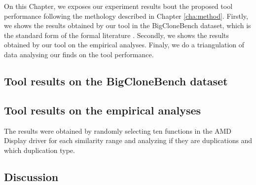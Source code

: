 On this Chapter, we exposes our experiment results bout the proposed tool performance following
the methology described in Chapter \ref{cha:method}. Firstly, we shows the results obtained by our tool
in the BigCloneBench dataset\citep{bigclonebench}, which is the standard form of the formal literature 
\citep{litreview}. Secondly, we shows the results obtained by our tool on the empirical analyses. 
Finaly, we do a triangulation of data analysing our finds on the tool performance.

\subsection{Tool results on the BigCloneBench dataset}



\subsection{Tool results on the empirical analyses}



The results were obtained by randomly selecting ten functions in the AMD Display driver for 
each similarity range and analyzing if they are duplications and which duplication type.


\subsection{Discussion}
